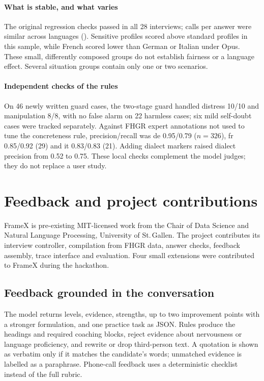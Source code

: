 \documentclass[10pt,a4paper]{article}
\newcommand{\crit}[2]{\tcbox[on line,colback=#1,colframe=#1,coltext=white,boxsep=0pt,left=3pt,right=3pt,top=1.5pt,bottom=1.5pt,arc=2pt,fontupper=\sffamily\bfseries\scriptsize]{#2}}
\newcommand{\inno}{\crit{rust}{Innovation 25\,\%}}
\begin{document}
\paragraph{What is stable, and what varies}
The original regression checks passed in all 28 interviews; calls per answer were similar across languages
(\callslang). Sensitive profiles scored above standard profiles in this sample, while French scored lower
than German or Italian under Opus. These small, differently composed groups do not establish fairness or
a language effect. \spread{} Several situation groups contain only one or two scenarios.

\paragraph{Independent checks of the rules}
On 46 newly written guard cases, the two-stage guard handled distress 10/10 and manipulation 8/8, with no
false alarm on 22 harmless cases; six mild self-doubt cases were tracked separately. Against FHGR expert
annotations not used to tune the concreteness rule, precision/recall was de 0.95/0.79 ($n=326$),
fr 0.85/0.92 (29) and it 0.83/0.83 (21). Adding dialect markers raised dialect precision from 0.52 to 0.75.
These local checks complement the model judges; they do not replace a user study.

\clearpage
\section{Feedback and project contributions}\label{sec:inno}\label{sec:feedback}
\inno{}\quad
FrameX is pre-existing MIT-licensed work from the Chair of Data Science and Natural Language Processing,
University of St.\,Gallen. The project contributes its interview controller, compilation from FHGR data,
answer checks, feedback assembly, trace interface and evaluation. Four small extensions were contributed
to FrameX during the hackathon.

\subsection*{Feedback grounded in the conversation}
The model returns levels, evidence, strengths, up to two improvement points with a stronger formulation,
and one practice task as JSON. Rules produce the headings and required coaching blocks, reject evidence
about nervousness or language proficiency, and rewrite or drop third-person text. A quotation is shown as
verbatim only if it matches the candidate's words; unmatched evidence is labelled as a paraphrase.
Phone-call feedback uses a deterministic checklist instead of the full rubric.
\end{document}
